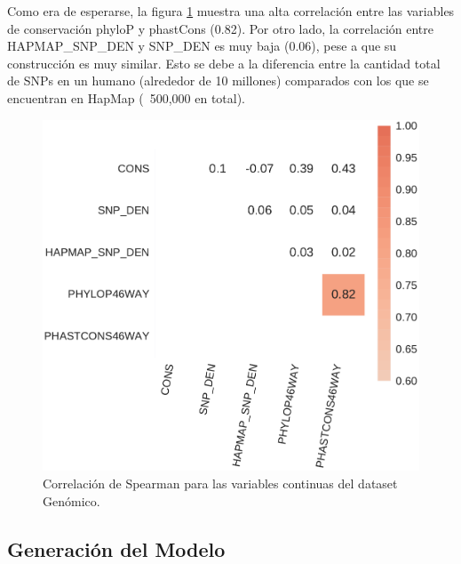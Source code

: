 
Como era de esperarse, la figura \ref{fig:corrplot_genomic} muestra una alta correlación entre las variables de conservación phyloP y phastCons (0.82). Por otro lado, la correlación entre HAPMAP\_SNP\_DEN y SNP\_DEN es muy baja (0.06), pese a que su construcción es muy similar. Esto se debe a la diferencia entre la cantidad total de SNPs en un humano (alrededor de 10 millones) comparados con los que se encuentran en HapMap (~500,000 en total).

\begin{figure}[H]
    \centering
    \includegraphics[scale=0.5]{documents/latex/figures/3/genomic/genomic_corr.pdf}
    \caption{Correlación de Spearman para las variables continuas del dataset Genómico.}
    \label{fig:corrplot_genomic}
\end{figure}


\subsection{Generación del Modelo}

